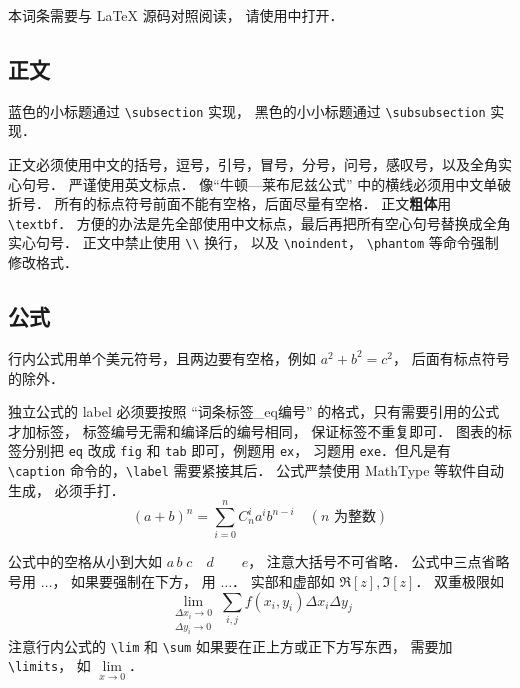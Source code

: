 

本词条需要与 LaTeX 源码对照阅读， 请使用中打开．

\subsection{正文}
蓝色的小标题通过 \lstinline|\subsection| 实现， 黑色的小小标题通过 \lstinline|\subsubsection| 实现．

正文必须使用中文的括号，逗号，引号，冒号，分号，问号，感叹号，以及全角实心句号． 严谨使用英文标点． 像“牛顿—莱布尼兹公式” 中的横线必须用中文单破折号． 所有的标点符号前面不能有空格，后面尽量有空格． 正文\textbf{粗体}用 \lstinline|\textbf|． 方便的办法是先全部使用中文标点，最后再把所有空心句号替换成全角实心句号． 正文中禁止使用 \lstinline|\\| 换行， 以及 \lstinline|\noindent|， \lstinline|\phantom| 等命令强制修改格式．

\subsection{公式}
行内公式用单个美元符号，且两边要有空格，例如 $a^2+b^2=c^2$， 后面有标点符号的除外．

独立公式的 label 必须要按照 “词条标签\_eq编号” 的格式，只有需要引用的公式才加标签， 标签编号无需和编译后的编号相同， 保证标签不重复即可． 图表的标签分别把 \lstinline|eq| 改成 \lstinline|fig| 和 \lstinline|tab| 即可，例题用 \lstinline|ex|， 习题用 \lstinline|exe|．但凡是有 \lstinline|\caption| 命令的，\lstinline|\label| 需要紧接其后． 公式严禁使用 MathType 等软件自动生成， 必须手打．
\begin{equation}\label{Sample_eq1}
(a+b)^n = \sum_{i=0}^n C_n^i a^i b^{n-i} \quad (\text{$n$ 为整数})
\end{equation}

公式中的空格从小到大如 $a\, b\; c\quad d\qquad e$， 注意大括号不可省略． 公式中三点省略号用 $\dots$， 如果要强制在下方， 用 $\ldots$． 实部和虚部如 $\Re[z], \Im[z]$． 双重极限如
\begin{equation}
\lim_{\substack{\Delta x_i\to 0\\ \Delta y_i\to 0}} \sum_{i, j} f(x_i,y_i) \Delta x_i \Delta y_j
\end{equation}
注意行内公式的 \lstinline|\lim| 和 \lstinline|\sum| 如果要在正上方或正下方写东西， 需要加 \lstinline|\limits|， 如 $\lim\limits_{x\to 0}$．


